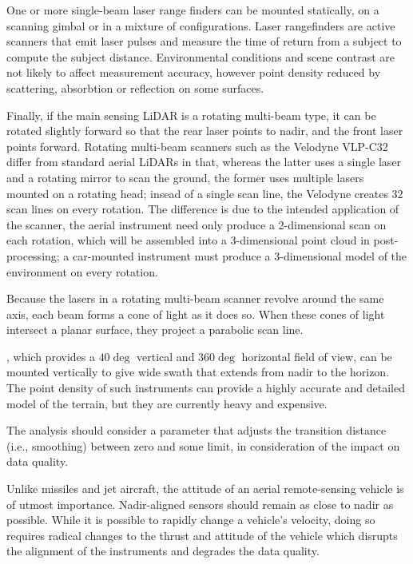 \documentclass[10pt,a4paper]{report}
\begin{document}
One or more single-beam laser range finders can be mounted statically, on a scanning gimbal or in a mixture of configurations. Laser rangefinders are active scanners that emit laser pulses and measure the time of return from a subject to compute the subject distance. Environmental conditions and scene contrast are not likely to affect measurement accuracy, however point density reduced by scattering, absorbtion or reflection on some surfaces. 

Finally, if the main sensing LiDAR is a rotating multi-beam type, it can be rotated slightly forward so that the rear laser points to nadir, and the front laser points forward. Rotating multi-beam scanners such as the Velodyne VLP-C32 differ from standard aerial LiDARs in that, whereas the latter uses a single laser and a rotating mirror to scan the ground, the former uses multiple lasers mounted on a rotating head; insead of a single scan line, the Velodyne creates 32 scan lines on every rotation. The difference is due to the intended application of the scanner, the aerial instrument need only produce a 2-dimensional scan on each rotation, which will be assembled into a 3-dimensional point cloud in post-processing; a car-mounted instrument must produce a 3-dimensional model of the environment on every rotation.

Because the lasers in a rotating multi-beam scanner revolve around the same axis, each beam forms a cone of light as it does so. When these cones of light intersect a planar surface, they project a parabolic scan line.

, which provides a $40\deg$ vertical and $360\deg$ horizontal field of view, can be mounted vertically to give wide swath that extends from nadir to the horizon. The point density of such instruments can provide a highly accurate and detailed model of the terrain, but they are currently heavy and expensive. 


The analysis should consider a parameter that adjusts the transition distance (i.e., smoothing) between zero and some limit, in consideration of the impact on data quality.

Unlike missiles and jet aircraft, the attitude of an aerial remote-sensing vehicle is of utmost importance. Nadir-aligned sensors should remain as close to nadir as possible. While it is possible to rapidly change a vehicle's velocity, doing so requires radical changes to the thrust and attitude of the vehicle which disrupts the alignment of the instruments and degrades the data quality.
\end{document}
